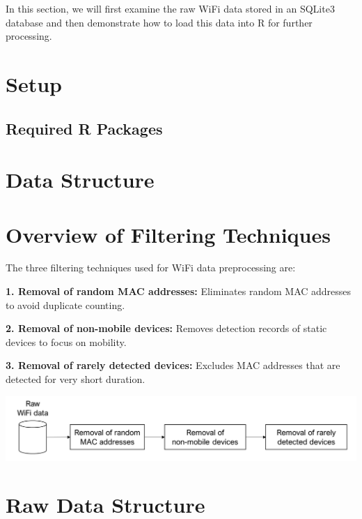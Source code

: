 \documentclass[
  letterpaper,
]{scrbook}
\begin{document}
In this section, we will first examine the raw WiFi data stored in an
SQLite3 database and then demonstrate how to load this data into R for
further processing.

\hypertarget{setup}{%
\section{Setup}\label{setup}}

\hypertarget{required-r-packages-1}{%
\subsection{Required R Packages}\label{required-r-packages-1}}

\hypertarget{data-structure}{%
\section{Data Structure}\label{data-structure}}

\hypertarget{overview-of-filtering-techniques}{%
\section{Overview of Filtering
Techniques}\label{overview-of-filtering-techniques}}

The three filtering techniques used for WiFi data preprocessing are:

\textbf{1. Removal of random MAC addresses:} Eliminates random MAC
addresses to avoid duplicate counting.

\textbf{2. Removal of non-mobile devices:} Removes detection records of
static devices to focus on mobility.

\textbf{3. Removal of rarely detected devices:} Excludes MAC addresses
that are detected for very short duration.

\includegraphics{content/material/ch3/preprocessing.png}

\hypertarget{raw-data-structure}{%
\section{Raw Data Structure}\label{raw-data-structure}}
\end{document}
